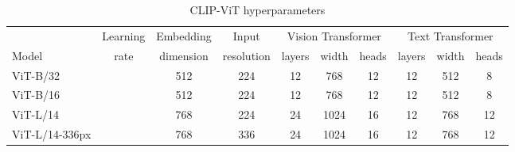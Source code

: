 \documentclass{article}
\begin{document}
\begin{table}[h!]
\begin{minipage}{\textwidth}
\small
\begin{tabular}{l|ccccccccc} \toprule
          & Learning & Embedding & Input      & \multicolumn{3}{c}{Vision Transformer} & \multicolumn{3}{c}{Text Transformer} \\
    Model & rate & dimension & resolution & layers & width & heads  & layers & width & heads \\ \midrule
    ViT-B/32 &  & 512 & 224 & 12 & 768 & 12 & 12 & 512 & 8 \\
    ViT-B/16 &  & 512 & 224 & 12 & 768 & 12 & 12 & 512 & 8 \\
    ViT-L/14 &  & 768 & 224 & 24 & 1024 & 16 & 12 & 768 & 12 \\
    ViT-L/14-336px &  & 768 & 336 & 24 & 1024 & 16 & 12 & 768 & 12 \\
    \bottomrule
\end{tabular}
\caption{CLIP-ViT hyperparameters}

\end{minipage}
\end{table}
\end{document}
